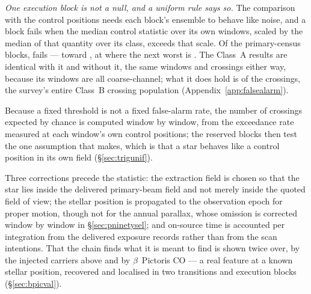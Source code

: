 \emph{One execution block is not a null, and a uniform rule says so.}
The comparison with the control positions needs each block's ensemble to behave
like noise, and a block fails when the median control statistic over its own
windows, scaled by the median of that quantity over its class, exceeds
\BqFactor{} that scale. Of the \BqNBlocks{} primary-census blocks, \BqNFail{}
fails --- \BqFailBlock{} toward \BqFailStar, at \BqFailQ{} where the next worst
is \BqNextQ. The Class~A results are identical with it and without it,
the same \BqWinACut{} windows and \BqXrossACut{} crossings either way, because
its \BqFailNWin{} windows are all coarse-channel; what it does hold is
\BqFailNCross{} of the \NCross{} crossings, the survey's entire Class~B
crossing population (Appendix~\ref{app:falsealarm}).

Because a fixed threshold is not a fixed false-alarm rate, the number of
crossings expected by chance is computed window by window, from the
exceedance rate measured at each window's own control positions; the reserved
blocks then test the one assumption that makes, which is that a star behaves
like a control position in its own field (\S\ref{sec:trigunif}).

Three corrections precede the statistic: the extraction field is chosen so
that the star lies inside the delivered primary-beam field and not merely
inside the quoted field of view; the stellar position is propagated to the
observation epoch for proper motion, though not for the annual parallax,
whose omission is corrected window by window in
\S\ref{sec:pninetysel}; and on-source time is accounted per integration
from the
delivered exposure records rather than from the scan intentions. That the
chain finds what it is meant to find is shown twice over, by the injected
carriers above and by $\beta$~Pictoris CO --- a real feature at a known
stellar position, recovered and localised in two transitions and
\NStageOneBpicEb{} execution blocks (\S\ref{sec:bpicval}).

